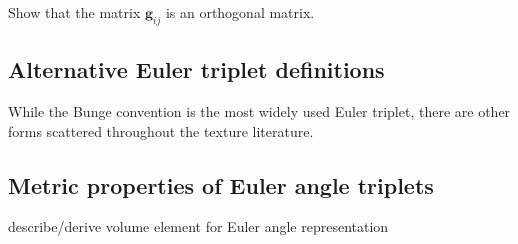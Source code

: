 \begin{exercise}
Show that the matrix $\mathbf{g}_{ij}$ is an orthogonal matrix.
\end{exercise}


\subsection{Alternative Euler triplet definitions\label{sec:Eulteralternatives}}
While the Bunge convention is the most widely used Euler triplet, there are other forms scattered throughout the texture literature. 

\subsection{Metric properties of Euler angle triplets\label{sec:eulermetric}}
{\color{blue}describe/derive volume element for Euler angle representation}

